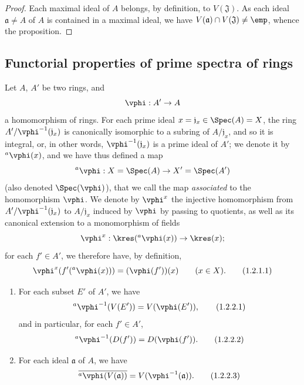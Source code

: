 \begin{proof}
Each maximal ideal of $A$ belongs, by definition, to $V(\mathfrak{J})$.
As each ideal $\mathfrak{a}\neq A$ of $A$ is contained in a maximal ideal, we have $V(\mathfrak{a})\cap V(\mathfrak{J})\neq\emp$, whence the proposition.
\end{proof}

\subsection{Functorial properties of prime spectra of rings}
\label{subsection:I.1.2}

\begin{env}[1.2.1]
\label{I.1.2.1}
Let $A$, $A'$ be two rings, and
\[
  \vphi:A'\to A
\]
a homomorphism of rings.
For each prime ideal $x=\mathfrak{j}_x\in\Spec(A)=X$, the ring $A'/\vphi^{-1}(\mathfrak{j}_x)$ is canonically isomorphic to a subring of $A/\mathfrak{j}_x$, and so it is integral, or, in other words, $\vphi^{-1}(\mathfrak{j}_x)$ is a prime ideal of $A'$;
we denote it by ${}^a\vphi(x)$, and we have thus defined a map
\[
  {}^a\vphi:X=\Spec(A)\to X'=\Spec(A')
\]
(also denoted $\Spec(\vphi)$), that we call the map \emph{associated} to the homomorphism $\vphi$.
We denote by $\vphi^x$ the injective homomorphism from $A'/\vphi^{-1}(\mathfrak{j}_x)$ to $A/\mathfrak{j}_x$ induced by $\vphi$ by passing to quotients, as well as its canonical extension to a monomorphism of fields
\[
  \vphi^x:\kres({}^a\vphi(x))\to\kres(x);
\]
for each $f'\in A'$, we therefore have, by definition,
\[
  \label{I.1.2.1.1}
  \vphi^x(f'({}^a\vphi(x)))=(\vphi(f'))(x)\qquad(x\in X).
  \tag{1.2.1.1}
\]
\end{env}

\begin{proposition}[1.2.2]
\label{I.1.2.2}
\medskip\noindent
\begin{enumerate}
  \item[{\rm(i)}] For each subset $E'$ of $A'$, we have
    \[
    \label{I.1.2.2.1}
      {}^a\vphi^{-1}(V(E'))=V(\vphi(E')),
      \tag{1.2.2.1}
    \]
    and in particular, for each $f'\in A'$,
    \[
    \label{I.1.2.2.2}
      {}^a\vphi^{-1}(D(f'))=D(\vphi(f')).
      \tag{1.2.2.2}
    \]
  \item[{\rm(ii)}] For each ideal $\mathfrak{a}$ of $A$, we have
    \[
    \label{I.1.2.2.3}
      \overline{{}^a\vphi(V(\mathfrak{a}))}=V(\vphi^{-1}(\mathfrak{a})).
      \tag{1.2.2.3}
    \]
\end{enumerate}
\end{proposition}

